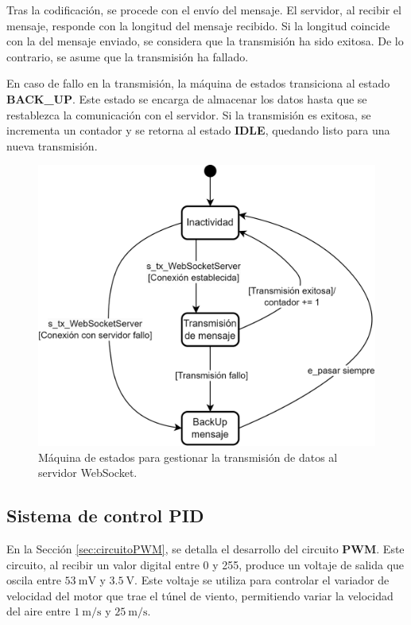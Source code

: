 Tras la codificación, se procede con el envío del mensaje. El servidor, al recibir el mensaje, responde con la longitud del mensaje recibido. Si la longitud coincide con la del mensaje enviado, se considera que la transmisión ha sido exitosa. De lo contrario, se asume que la transmisión ha fallado.

En caso de fallo en la transmisión, la máquina de estados transiciona al estado \textbf{BACK\_UP}. Este estado se encarga de almacenar los datos hasta que se restablezca la comunicación con el servidor. Si la transmisión es exitosa, se incrementa un contador y se retorna al estado \textbf{IDLE}, quedando listo para una nueva transmisión.


\begin{figure}[H]
    \centering
    \includegraphics[width=0.7\linewidth]{Figuras/datalogger/Firmware/sc_transmisionServer.png}
    \caption{Máquina de estados para gestionar la transmisión de datos al servidor WebSocket.}
    \label{fig:transmisionServer}
\end{figure}


\subsection{Sistema de control PID}\label{sec:sistemaDeControlPid}

En la Sección \ref{sec:circuitoPWM}, se detalla el desarrollo del circuito \textbf{PWM}. Este circuito, al recibir un valor digital entre 0 y 255, produce un voltaje de salida que oscila entre $\SI{53}{\milli\volt}$ y $\SI{3.5}{\volt}$. Este voltaje se utiliza para controlar el variador de velocidad del motor que trae el túnel de viento, permitiendo variar la velocidad del aire entre $\SI{1}{\meter\per\second}$ y $\SI{25}{\meter\per\second}$.

